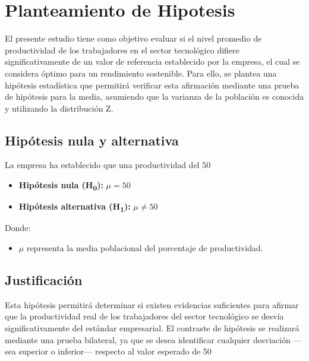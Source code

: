 \section{Planteamiento de Hipotesis}

El presente estudio tiene como objetivo evaluar si el nivel promedio de productividad de los trabajadores en el sector tecnológico difiere significativamente de un valor de referencia establecido por la empresa, el cual se considera óptimo para un rendimiento sostenible. Para ello, se plantea una hipótesis estadística que permitirá verificar esta afirmación mediante una prueba de hipótesis para la media, asumiendo que la varianza de la población es conocida y utilizando la distribución Z.

\subsection*{Hipótesis nula y alternativa}

La empresa ha establecido que una productividad del 50%

\begin{itemize}
\item \textbf{Hipótesis nula (H\textsubscript{0}):} $\mu = 50$
\item \textbf{Hipótesis alternativa (H\textsubscript{1}):} $\mu \neq 50$
\end{itemize}

Donde:
\begin{itemize}
\item $\mu$ representa la media poblacional del porcentaje de productividad.
\end{itemize}

\subsection*{Justificación}

Esta hipótesis permitirá determinar si existen evidencias suficientes para afirmar que la productividad real de los trabajadores del sector tecnológico se desvía significativamente del estándar empresarial. El contraste de hipótesis se realizará mediante una prueba bilateral, ya que se desea identificar cualquier desviación —sea superior o inferior— respecto al valor esperado de 50%

